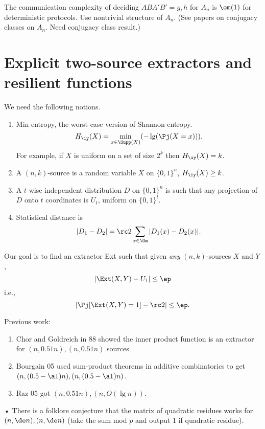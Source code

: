 The communication complexity of deciding $ABA'B'=g,h$ for $A_n$ is $\om(1)$ for deterministic protocols.
Use nontrivial structure of $A_n$. (See papers on conjugacy classes on $A_n$. Need conjugacy class result.)


\section{Explicit two-source extractors and resilient functions}

We need the following notions.
\begin{enumerate}
\item
Min-entropy, the worst-case version of Shannon entropy.
\[
H_{\iy}(X)=\min_{x\in \Supp(X)}(-\lg(\Pj(X=x))).
\]
For example, if $X$ is uniform on a set of size $2^k$ then $H_{\iy}(X)=k$.
\item
A $(n,k)$-source is a random variable $X$ on $\{0,1\}^n$, $H_{\iy}(X)\ge k$.
\item
A $t$-wise independent distribution $D$  on $\{0,1\}^n$ is such that any projection of $D$ onto $t$ coordinates is $U_t$, uniform on $\{0,1\}^t$.
\item
Statistical distance is
\[
|D_1-D_2|=\rc2\sum_{x\in \Om} |D_1(x)-D_2(x)|.
\]
\end{enumerate}
Our goal is to find an extractor Ext such that given \emph{any} $(n,k)$-sources $X$ and $Y$,
\[
|\Ext(X,Y)-U_1|\le \ep
\]
i.e.,
\[
|\Pj[\Ext(X,Y)=1]-\rc2|\le \ep.
\]

Previous work:
\begin{enumerate}
\item
Chor and Goldreich in 88 showed the inner product function is an extractor for $(n,0.51n), (n,0.51n)$ sources.
\item
Bourgain 05 used sum-product theorems in additive combinatorics to get $(n,(0.5-\al)n), (n,(0.5-\al)n)$. 
\item
Raz 05 got $(n,0.51n), (n,O(\lg n))$.
\end{enumerate}•
There is a folklore conjecture that the matrix of quadratic residues works for $(n,\de n),(n,\de n)$ (take the sum mod $p$ and output 1 if quadratic residue).

